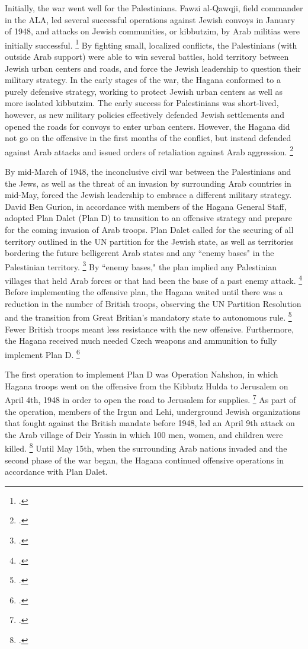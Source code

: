 \documentclass[12pt]{turabian-researchpaper}
\begin{document}
Initially, the war went well for the Palestinians.  Fawzi al-Qawqji, field commander in the ALA, led several successful operations against Jewish convoys in January of 1948, and attacks on Jewish communities, or kibbutzim, by Arab militias were initially successful.
\footcite[][79]{pappe}
By fighting small, localized conflicts, the Palestinians (with outside Arab support) were able to win several battles, hold territory between Jewish urban centers and roads, and force the Jewish leadership to question their military strategy.  In the early stages of the war, the Hagana conformed to a purely defensive strategy, working to protect Jewish urban centers as well as more isolated kibbutzim.  The early success for Palestinians was short-lived, however, as new military policies effectively defended Jewish settlements and opened the roads for convoys to enter urban centers.  However, the Hagana did not go on the offensive in the first months of the conflict, but instead defended against Arab attacks and issued orders of retaliation against Arab aggression.
\footcite[][68]{tal}



By mid-March of 1948, the inconclusive civil war between the Palestinians and the Jews, as well as the threat of an invasion by surrounding Arab countries in mid-May, forced the Jewish leadership to embrace a different military strategy.  David Ben Gurion, in accordance with members of the Hagana General Staff, adopted Plan Dalet (Plan D) to transition to an offensive strategy and prepare for the coming invasion of Arab troops.  Plan Dalet called for the securing of all territory outlined in the UN partition for the Jewish state, as well as territories bordering the future belligerent Arab states and any ``enemy bases" in the Palestinian territory.
\footcite{khalidi}
By ``enemy bases," the plan implied any Palestinian villages that held Arab forces or that had been the base of a past enemy attack.
\footcite[][119]{morris}
Before implementing the offensive plan, the Hagana waited until there was a reduction in the number of British troops, observing the UN Partition Resolution and the transition from Great Britian's mandatory state to autonomous rule.
\footcite[][32]{herzog}
Fewer British troops meant less resistance with the new offensive.  Furthermore, the Hagana received much needed Czech weapons and ammunition to fully implement Plan D.
\footcite[][116]{morris}



The first operation to implement Plan D was Operation Nahshon, in which Hagana troops went on the offensive from the Kibbutz Hulda to Jerusalem on April 4th, 1948 in order to open the road to Jerusalem for supplies.
\footcite[][121]{morris}
As part of the operation, members of the Irgun and Lehi, underground Jewish organizations that fought against the British mandate before 1948, led an April 9th attack on the Arab village of Deir Yassin in which 100 men, women, and children were killed.
\footcite{nabka}
Until May 15th, when the surrounding Arab nations invaded and the second phase of the war began, the Hagana continued offensive operations in accordance with Plan Dalet.
\end{document}
